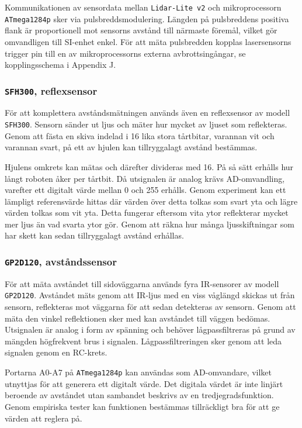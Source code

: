 \documentclass[11pt]{article}
\begin{document}
\begin{flushleft}
Kommunikationen av sensordata mellan \verb+Lidar-Lite v2+ och mikroprocessorn \verb+ATmega1284p+ sker via pulsbreddsmodulering. Längden på pulsbreddens positiva flank är proportionell mot sensorns avstånd till närmaste föremål, vilket gör omvandligen till SI-enhet enkel. För att mäta pulsbredden kopplas lasersensorns trigger pin till en av mikroprocessorns externa avbrottsingångar, se kopplingsschema i Appendix J. 

\subsubsection{\texttt{SFH300}, reflexsensor}
För att komplettera avståndsmätningen används även en reflexsensor av modell \verb+SFH300+. Sensorn sänder ut ljus och mäter hur mycket av ljuset som reflekteras. Genom att fästa en skiva indelad i 16 lika stora tårtbitar, varannan vit och varannan svart, på ett av hjulen kan tillryggalagt avstånd bestämmas.

Hjulens omkrets kan mätas och därefter divideras med 16. På så sätt erhålls hur långt roboten åker per tårtbit.
Då utsignalen är analog krävs AD-omvandling, varefter ett digitalt värde mellan 0 och 255 erhålls. Genom experiment kan ett lämpligt referensvärde hittas där värden över detta tolkas som svart yta och lägre värden tolkas som vit yta. Detta fungerar eftersom vita ytor reflekterar mycket mer ljus än vad svarta ytor gör. Genom att räkna hur många ljusskiftningar som har skett kan sedan tillryggalagt avstånd erhållas.

\subsubsection{\texttt{GP2D120}, avståndssensor}
För att mäta avståndet till sidoväggarna används fyra IR-sensorer av modell \verb+GP2D120+. Avståndet mäts genom att IR-ljus med en viss våglängd skickas ut från sensorn, reflekteras mot väggarna för att sedan detekteras av sensorn. Genom att mäta den vinkel reflektionen sker med kan avståndet till väggen bedömas. Utsignalen är analog i form av spänning och behöver lågpassfiltreras på grund av mängden högfrekvent brus i signalen. Lågpassfiltreringen sker genom att leda signalen genom en RC-krets. 

Portarna A0-A7 på \verb+ATmega1284p+ kan användas som AD-omvandare, vilket utnyttjas för att generera ett digitalt värde. Det digitala värdet är inte linjärt beroende av avståndet utan sambandet beskrivs av en tredjegradsfunktion. Genom empiriska tester kan funktionen bestämmas tillräckligt bra för att ge värden att reglera på.


\end{flushleft}
\end{document}
